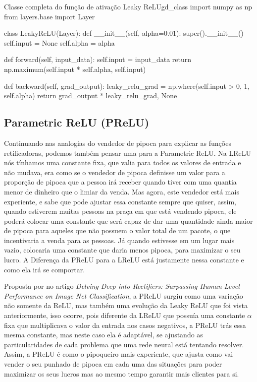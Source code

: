 \begin{codelisting}{Classe completa do função de ativação Leaky ReLU}{gd_class}
import numpy as np
from layers.base import Layer


class LeakyReLU(Layer):
    def __init__(self, alpha=0.01):
        super().__init__()
        self.input = None
        self.alpha = alpha

    def forward(self, input_data):
        self.input = input_data
        return np.maximum(self.input * self.alpha, self.input)

    def backward(self, grad_output):
        leaky_relu_grad = np.where(self.input > 0, 1, self.alpha)
        return grad_output * leaky_relu_grad, None
\end{codelisting}

\subsection{Parametric ReLU (PReLU)}

Continuando nas analogias do vendedor de pipoca para explicar as funções retificadoras, podemos também pensar uma para a Parametric ReLU. Na LReLU nós tínhamos uma constante fixa, que valia para todos os valores de entrada e não mudava, era como se o vendedor de pipoca definisse um valor para a proporção de pipoca que a pessoa irá receber quando tiver com uma quantia menor de dinheiro que o limiar da venda. Mas agora, este vendedor está mais experiente, e sabe que pode ajustar essa constante sempre que quiser, assim, quando estiverem muitas pessoas na praça em que está vendendo pipoca, ele poderá colocar uma constante que será capaz de dar uma quantidade ainda maior de pipoca para aqueles que não possuem o valor total de um pacote, o que incentivaria a venda para as pessoas. Já quando estivesse em um lugar mais vazio, colocaria uma constante que daria menos pipoca, para maximizar o seu lucro. A Diferença da PReLU para a LReLU está justamente nessa constante e como ela irá se comportar.

Proposta por \textcite{PReLUArticle} no artigo \textit{Delving Deep into Rectifiers: Surpassing Human Level Performance on Image Net Classification}, a PReLU surgiu como uma variação não somente da ReLU, mas também uma evolução da Leaky ReLU que foi vista anteriormente, isso ocorre, pois diferente da LReLU que possuía uma constante $\alpha$ fixa que multiplicava o valor da entrada nos casos negativos, a PReLU trás essa mesma constante, mas neste caso ela é adaptável, se ajustando as particularidades de cada problema que uma rede neural está tentando resolver. Assim, a PReLU é como o pipoqueiro mais experiente, que ajusta como vai vender o seu punhado de pipoca em cada uma das situações para poder maximizar os seus lucros mas ao mesmo tempo garantir mais clientes para si.

